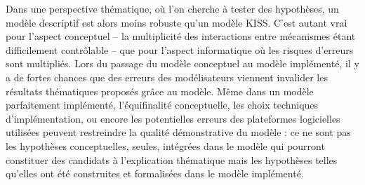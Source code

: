 Dans une perspective thématique, où l'on cherche à tester des hypothèses, un modèle descriptif est alors moins robuste qu'un modèle KISS.
C'est autant vrai pour l'aspect conceptuel -- la multiplicité des interactions entre mécanismes étant difficilement contrôlable -- que pour l'aspect informatique où les risques d'erreurs sont multipliés.
Lors du passage du modèle conceptuel au modèle implémenté, il y a de fortes chances que des erreurs des modélisateurs viennent invalider les résultats thématiques proposés grâce au modèle.
Même dans un modèle parfaitement implémenté, l'équifinalité conceptuelle, les choix techniques d'implémentation, ou encore les potentielles erreurs des plateformes logicielles utilisées peuvent restreindre la qualité démonstrative du modèle :
	ce ne sont pas les hypothèses conceptuelles, seules, intégrées dans le modèle qui pourront constituer des candidats à l'explication thématique mais les hypothèses telles qu'elles ont été construites et formalisées dans le modèle implémenté.


